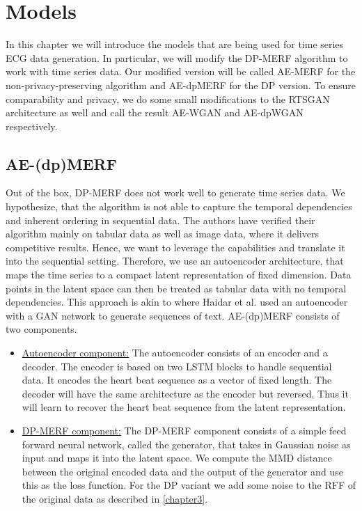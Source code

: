 \section{Models}\label{chapter4}
In this chapter we will introduce the models that are being used for time series ECG data generation. In particular, we will modify the DP-MERF algorithm to work with time series data. Our modified version will be called AE-MERF for the non-privacy-preserving algorithm and AE-dpMERF for the DP version. To ensure comparability and privacy, we do some small modifications to the RTSGAN architecture as well and call the result AE-WGAN and AE-dpWGAN respectively.

\subsection{AE-(dp)MERF}
Out of the box, DP-MERF does not work well to generate time series data. We hypothesize, that the algorithm is not able to capture the temporal dependencies and inherent ordering in sequential data. The authors have verified their algorithm mainly on tabular data as well as image data, where it delivers competitive results. Hence, we want to leverage the capabilities and translate it into the sequential setting. Therefore, we use an autoencoder architecture, that maps the time series to a compact latent representation of fixed dimension. Data points in the latent space can then be treated as tabular data with no temporal dependencies. This approach is akin to \parencite{gan_softtext} where Haidar et al. used an autoencoder with a GAN network to generate sequences of text. AE-(dp)MERF consists of two components.
\begin{itemize}
    \item \underline{Autoencoder component:} The autoencoder consists of an encoder and a decoder. The encoder is based on two LSTM blocks to handle sequential data. It encodes the heart beat sequence as a vector of fixed length. The decoder will have the same architecture as the encoder but reversed. Thus it will learn to recover the heart beat sequence from the latent representation.
    \item \underline{DP-MERF component:} The DP-MERF component consists of a simple feed forward neural network, called the generator, that takes in Gaussian noise as input and maps it into the latent space. We compute the MMD distance between the original encoded data and the output of the generator and use this as the loss function. For the DP variant we add some noise to the RFF of the original data as described in \cref{chapter3}.
\end{itemize}

